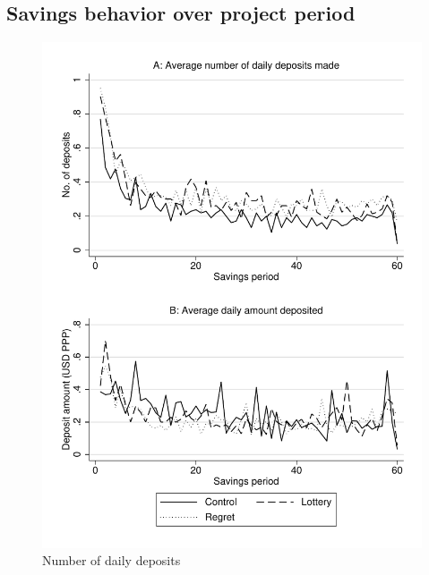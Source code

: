 \documentclass[11pt]{article}
\begin{document}
	\clearpage

	\subsection{Savings behavior over project period}

		\begin{figure}[ht]
		\centering
		\caption{Number of daily deposits}
		\includegraphics[width=\textwidth]{../../figures/line-deposits.pdf}
		\end{figure}
\end{document}
